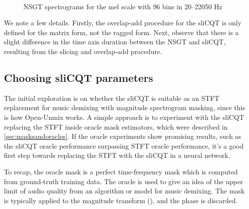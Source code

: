 \documentclass[report.tex]{subfiles}
\begin{document}
\begin{figure}[ht]
	\centering
	\\
	\caption{NSGT spectrograms for the mel scale with 96 bins in 20--22050 Hz}
	\label{fig:overlappedspectrograms}
\end{figure}

We note a few details. Firstly, the overlap-add procedure for the sliCQT is only defined for the matrix form, not the ragged form. Next, observe that there is a slight difference in the time axis duration between the NSGT and sliCQT, resulting from the slicing and overlap-add procedure.

\newpagefill

\subsection{Choosing sliCQT parameters}
\label{sec:slicqparamsrch}

The initial exploration is on whether the sliCQT is suitable as an STFT replacement for music demixing with magnitude spectrogram masking, since this is how Open-Unmix works. A simple approach is to experiment with the sliCQT replacing the STFT inside oracle mask estimators, which were described in \ref{sec:masksandoracles}. If the oracle experiments show promising results, such as the sliCQT oracle performance surpassing STFT oracle performance, it's a good first step towards replacing the STFT with the sliCQT in a neural network.

To recap, the oracle mask is a perfect time-frequency mask which is computed from ground-truth training data. The oracle is used to give an idea of the upper limit of audio quality from an algorithm or model for music demixing. The mask is typically applied to the magnitude transform (\cite{umx}), and the phase is discarded.
\end{document}
